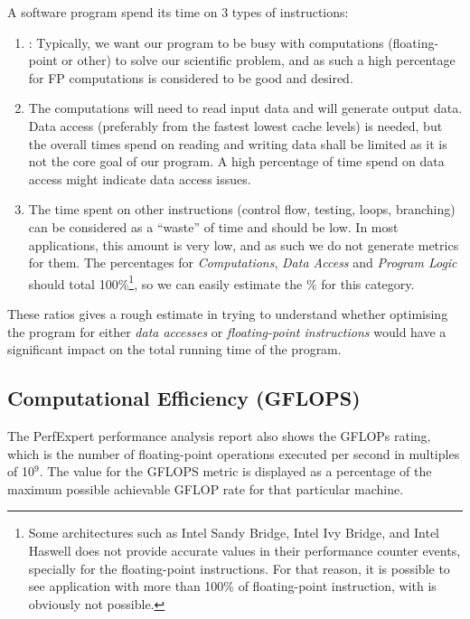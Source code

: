 A software program spend its time on 3 types of instructions:

\begin{enumerate}
  \item  {}: Typically, we want our program to be busy with computations (floating-point or other) to solve our scientific problem, and as such a high percentage for FP computations is considered to be good and desired.
  \item  {} The computations will need to read input data and will generate output data. Data access (preferably from the fastest lowest cache levels) is needed, but the overall times spend on reading and writing data shall be limited as it is not the core goal of our program. A high percentage of time spend on data access might indicate data access issues.
  \item  {} The time spent on other instructions (control flow, testing, loops, branching) can be considered as a ``waste'' of time and should be low. In most applications, this amount is very low, and as such we do not generate metrics for them. The percentages for \emph{Computations}, \emph{Data Access} and \emph{Program Logic}
  should total 100\%\footnote{Some architectures such as Intel Sandy Bridge, Intel Ivy Bridge, and Intel Haswell does not provide accurate values in their performance counter events, specially for the floating-point instructions. For that reason, it is possible to see application with more than 100\% of floating-point instruction, with is obviously not possible.}, so we can easily estimate the \% for this category.
\end{enumerate}

These ratios gives a rough estimate in trying to understand whether optimising the program for either \emph{data accesses} or \emph{floating-point instructions} would have a significant impact on the total running time of the program.

\subsection{Computational Efficiency (GFLOPS)}
\label{subsec:Computational_Efficiancy}

The PerfExpert performance analysis report also shows the GFLOPs rating, which is the number of floating-point operations executed per second in multiples of 10${}^{9}$. The value for the GFLOPS metric is displayed as a percentage of the maximum possible achievable GFLOP rate for that particular machine.

